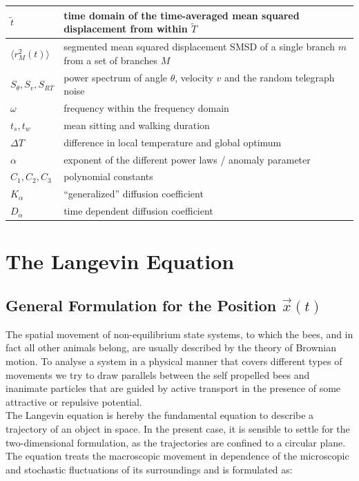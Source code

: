 \begin{table}[H]
\begin{tabular}{p{1.4cm}|p{12.4cm}}
         \hline
         $\tilde{t}$ & time domain of the time-averaged mean squared displacement from within $\tilde{T}$ \\
         \hline
         $\langle r_{M}^{2}(t) \rangle$ & segmented mean squared displacement SMSD of a single branch $m$ from a set of branches $M$ \\
         \hline
         $S_{\theta}, S_{v}, S_{RT}$ & power spectrum of angle $\theta$, velocity $v$ and the random telegraph noise\\
         \hline
         $\omega$ & frequency within the frequency domain \\
         \hline
         $t_{s}, t_{w}$ & mean sitting and walking duration \\
         \hline
         $\Delta T$ & difference in local temperature and global optimum \\
         \hline
         $\alpha$ & exponent of the different power laws / anomaly parameter \\
         \hline
         $C_1, C_2, C_3$ & polynomial constants \\
         \hline
         $K_{\alpha}$ & ``generalized'' diffusion coefficient \\
         \hline
         $D_{\alpha}$ & time dependent diffusion coefficient \\
         
    \end{tabular}
    \label{tab:vardescription}
\end{table}
\newpage


\section{The Langevin Equation}

\subsection{General Formulation for the Position $\vec{x}(t)$ }

The spatial movement of non-equilibrium state systems, to which the bees, and in fact all other animals belong, are usually described by the theory of Brownian motion. To analyse a system in a physical manner that covers different types of movements we try to draw parallels between the self propelled bees and inanimate particles that are guided by active transport in the presence of some attractive or repulsive potential.
\\
The Langevin equation is hereby the fundamental equation to describe a trajectory of an object in space. In the present case, it is sensible to settle for the two-dimensional formulation, as the trajectories are confined to a circular plane. The equation treats the macroscopic movement in dependence of the microscopic and stochastic fluctuations of its surroundings and is formulated as:


